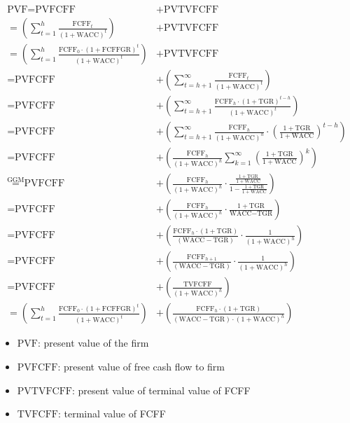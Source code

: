 $$
\begin{aligned}
\text{PVF} = \text{PVFCFF} &+ \text{PVTVFCFF} \\
= \left( \sum_{t=1}^{h} \frac{\text{FCFF}_t}{(1 + \text{WACC})^t} \right) &+ \text{PVTVFCFF} \\
= \left( \sum_{t=1}^{h} \frac{\text{FCFF}_0 \cdot (1+\text{FCFFGR})^t}{(1+\text{WACC})^t} \right) &+ \text{PVTVFCFF} \\
= \text{PVFCFF} &+ \left( \sum_{t=h+1}^{\infty} \frac{\text{FCFF}_t}{(1 + \text{WACC})^t} \right) \\
= \text{PVFCFF} &+ \left( \sum_{t=h+1}^{\infty} \frac{\text{FCFF}_h \cdot (1+\text{TGR})^{t-h}}{(1+\text{WACC})^t} \right) \\
= \text{PVFCFF} &+ \left( \sum_{t=h+1}^{\infty} \frac{\text{FCFF}_h}{(1+\text{WACC})^h} \cdot \left( \frac{1+\text{TGR}}{1+\text{WACC}} \right)^{t-h} \right) \\
= \text{PVFCFF} &+ \left( \frac{\text{FCFF}_h}{(1+\text{WACC})^h} \sum_{k=1}^{\infty} \left( \frac{1+\text{TGR}}{1+\text{WACC}} \right)^k \right) \\
\overset{\text{GGM}}{=} \text{PVFCFF} &+ \left( \frac{\text{FCFF}_h}{(1+\text{WACC})^h} \cdot \frac{\frac{1+\text{TGR}}{1+\text{WACC}}}{1 - \frac{1+\text{TGR}}{1+\text{WACC}}} \right) \\
= \text{PVFCFF} &+ \left( \frac{\text{FCFF}_h}{(1+\text{WACC})^h} \cdot \frac{1+\text{TGR}}{\text{WACC} - \text{TGR}} \right) \\
= \text{PVFCFF} &+ \left( \frac{\text{FCFF}_h \cdot (1+\text{TGR})}{(\text{WACC} - \text{TGR})} \cdot \frac{1}{(1+\text{WACC})^h} \right) \\
= \text{PVFCFF} &+ \left( \frac{\text{FCFF}_{h+1}}{(\text{WACC} - \text{TGR})} \cdot \frac{1}{(1 + \text{WACC})^h} \right) \\
= \text{PVFCFF} &+ \left( \frac{\text{TVFCFF}}{(1 + \text{WACC})^h} \right) \\
= \left( \sum_{t=1}^{h} \frac{\text{FCFF}_0 \cdot (1+\text{FCFFGR})^t}{(1+\text{WACC})^t} \right) &+ \left( \frac{\text{FCFF}_h \cdot (1+\text{TGR})}{(\text{WACC} - \text{TGR}) \cdot (1 + \text{WACC})^h} \right)
\end{aligned}
$$

\begin{itemize}
  \item[] $\text{PVF}$: present value of the firm
  \item[] $\text{PVFCFF}$: present value of free cash flow to firm
  \item[] $\text{PVTVFCFF}$: present value of terminal value of FCFF
  \item[] $\text{TVFCFF}$: terminal value of FCFF
\end{itemize}

